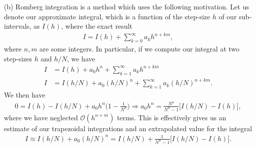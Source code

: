{(b) Romberg integration is a method which uses the following motivation.
Let us denote our approximate integral, which is a function of the step-size $h$ of our sub-intervals, as $I(h)$, where the exact result
\begin{align}
    I = I(h) + \sum_{k=0}^{\infty} a_{k} h^{n+km}
,\end{align}
where $n,m$ are some integers.
In particular, if we compute our integral at two step-sizes $h$ and $h/N$, we have
\begin{align}
    I &= I(h) + a_0 h^{n} + \sum_{k=1}^{\infty} a_{k} h^{n+km} \\
    I &= I(h/N) + a_0 (h/N)^{n} + \sum_{k=1}^{\infty} a_{k} (h/N)^{n+km}
.\end{align}
We then have
\begin{align}
    0 = I(h) - I(h/N) + a_0 h^{n} \Big( 1 - \frac{1}{N^{n}} \Big) \Rightarrow a_0 h^{n} = \frac{N^{n}}{N^{n} - 1} \Big[ I(h/N) - I(h) \Big]
,\end{align}
where we have neglected $\mathcal{O}(h^{n+m})$ terms.
This is effectively gives us an estimate of our trapezoidal integrations and an extrapolated value for the integral
\begin{align}
    I \approx I(h/N) + a_0 (h/N)^{n} = I(h/N) + \frac{1}{N^{n} - 1} \Big[ I(h/N) - I(h) \Big]
.\end{align}


}
